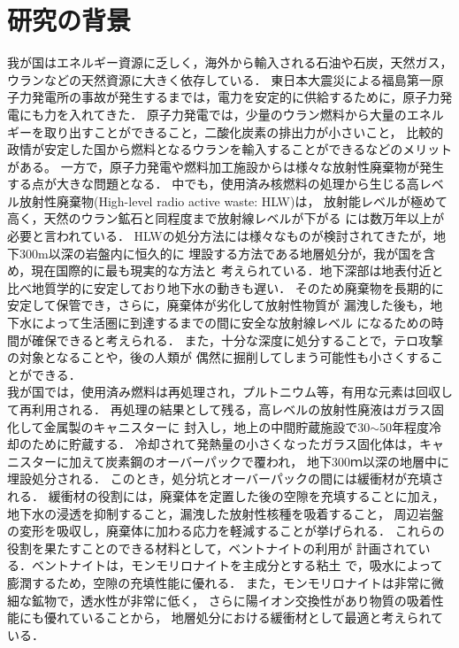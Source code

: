 \section{研究の背景}
我が国はエネルギー資源に乏しく，海外から輸入される石油や石炭，天然ガス，ウランなどの天然資源に大きく依存している．
東日本大震災による福島第一原子力発電所の事故が発生するまでは，電力を安定的に供給するために，原子力発電にも力を入れてきた．
原子力発電では，少量のウラン燃料から大量のエネルギーを取り出すことができること，二酸化炭素の排出力が小さいこと，
比較的政情が安定した国から燃料となるウランを輸入することができるなどのメリットがある。
一方で，原子力発電や燃料加工施設からは様々な放射性廃棄物が発生する点が大きな問題となる．
中でも，使用済み核燃料の処理から生じる高レベル放射性廃棄物(High-level radio active waste: HLW)は，
放射能レベルが極めて高く，天然のウラン鉱石と同程度まで放射線レベルが下がる
には数万年以上が必要と言われている．
HLWの処分方法には様々なものが検討されてきたが，地下300m以深の岩盤内に恒久的に
埋設する方法である地層処分が，我が国を含め，現在国際的に最も現実的な方法と
考えられている．地下深部は地表付近と比べ地質学的に安定しており地下水の動きも遅い．
そのため廃棄物を長期的に安定して保管でき，さらに，廃棄体が劣化して放射性物質が
漏洩した後も，地下水によって生活圏に到達するまでの間に安全な放射線レベル
になるための時間が確保できると考えられる．
また，十分な深度に処分することで，テロ攻撃の対象となることや，後の人類が
偶然に掘削してしまう可能性も小さくすることができる．\\

我が国では，使用済み燃料は再処理され，プルトニウム等，有用な元素は回収して再利用される．
再処理の結果として残る，高レベルの放射性廃液はガラス固化して金属製のキャニスターに
封入し，地上の中間貯蔵施設で30$\sim$50年程度冷却のために貯蔵する．
冷却されて発熱量の小さくなったガラス固化体は，キャニスターに加えて炭素鋼のオーバーパックで覆われ，
地下300ｍ以深の地層中に埋設処分される．
このとき，処分坑とオーバーパックの間には緩衝材が充填される．
緩衝材の役割には，廃棄体を定置した後の空隙を充填することに加え，
地下水の浸透を抑制すること，漏洩した放射性核種を吸着すること，
周辺岩盤の変形を吸収し，廃棄体に加わる応力を軽減することが挙げられる．
これらの役割を果たすことのできる材料として，ベントナイトの利用が
計画されている．ベントナイトは，モンモリロナイトを主成分とする粘土
で，吸水によって膨潤するため，空隙の充填性能に優れる．
また，モンモリロナイトは非常に微細な鉱物で，透水性が非常に低く，
さらに陽イオン交換性があり物質の吸着性能にも優れていることから，
地層処分における緩衝材として最適と考えられている．\\

